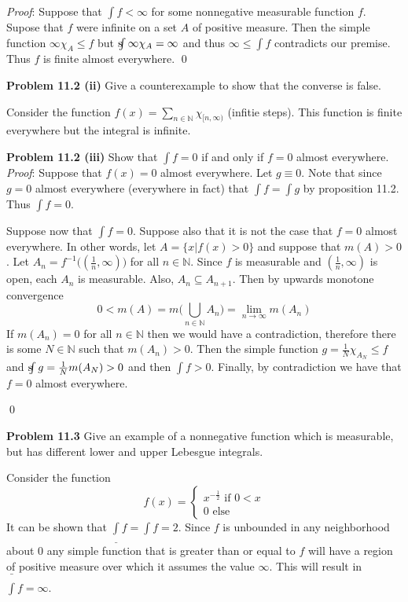 \documentclass[12pt]{article}
\newcommand{\problem}[1]{\hspace{-4 ex} \large \textbf{Problem #1} }
\newcommand{\sint}{\text{s}\kern-5pt\int}
\renewenvironment{proof}{\hspace{-4 ex} \emph{Proof}:}{\qed}
\begin{document}
	\begin{proof}
 		Suppose that $\int f<\infty$ for some nonnegative measurable function $f$. Supose that $f$ were infinite on a set $A$ of positive measure. Then the simple function $\infty \chi_A \leq f$ but $\sint \infty \chi_A = \infty$ and thus $ \infty \leq \int f$ contradicts our premise. Thus $f$ is finite almost everywhere.
 	\end{proof}
 		
\problem{11.2 (ii)} Give a counterexample to show that the converse is false. \bigbreak

 		Consider the function $f(x) = \sum\limits_{n\in \mathbb{N}} \chi_{[n, \infty)}$ (infitie steps). This function is finite everywhere but the integral is infinite. \bigbreak
 		
\problem{11.2 (iii)} Show that $\int f=0$ if and only if $f=0$ almost everywhere.
	\begin{proof}
 		Suppose that $f(x)=0$ almost everywhere. Let $g \equiv 0$. Note that since $g = 0$ almost everywhere (everywhere in fact) that $\int f = \int g$ by proposition 11.2. Thus $\int f = 0$.
 		
 		Suppose now that $\int f = 0$. Suppose also that it is not the case that $f=0$ almost everywhere. In other words, let $A = \{x \vert f(x)>0\}$ and suppose that $m(A) > 0$. Let $A_n = f^{-1} \Big( (\tfrac{1}{n},\infty) \Big)$ for all $n \in \mathbb{N}$. Since $f$ is measurable and $(\tfrac{1}{n},\infty)$ is open, each $A_n$ is measurable. Also, $A_n \subseteq A_{n+1}$. Then by upwards monotone convergence
 		$$
 		0< m(A) = m \Big( \bigcup_{n \in \mathbb{N}} A_n \Big ) = \lim_{n \to \infty} m(A_n)
 		$$
 		If $m(A_n)=0$ for all $n \in \mathbb{N}$ then we would have a contradiction, therefore there is some $N \in \mathbb{N}$ such that $m(A_n)>0$. Then the simple function $g = \tfrac{1}{N}\chi_{A_N} \leq f$ and $\sint g = \tfrac{1}{N} m(A_N) > 0$ and then $\int f >0$. Finally, by contradiction we have that $f=0$ almost everywhere.
 		
	\end{proof}

\problem{11.3} Give an example of a nonnegative function which is measurable, but has different lower and upper Lebesgue integrals.

	Consider the function 
	\[
	f(x) = \begin{cases}
		x^{-\frac{1}{2}} \text{ if } 0<x\\
		0 \text{ else}
	\end{cases}
	\]
	It can be shown that $ \underline{\int}f = \int f = 2$. Since $f$ is unbounded in any neighborhood about $0$ any simple function that is greater than or equal to $f$ will have a region of positive measure over which it assumes the value $\infty$. This will result in $\bar{\int}f = \infty$.
	
\end{document}

